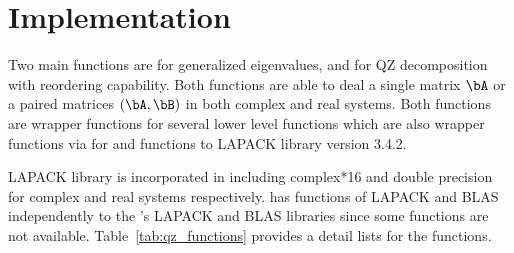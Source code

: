 

\section[Implementation]{Implementation}
\label{sec:implementation}

Two main functions are 
for generalized eigenvalues, and  for QZ decomposition with
reordering capability. Both functions are able to deal a single matrix $\bA$
or a paired matrices $(\bA,\bB)$ in both complex and real systems.
Both functions are wrapper functions for several lower level
 functions  which are also wrapper functions
via 
for  and  functions to LAPACK library 
version 3.4.2.

LAPACK library is incorporated in  including
complex*16 and double precision for complex and real systems respectively.
 has functions of
LAPACK and BLAS~\citep{BLAS}
independently to the 's LAPACK and BLAS libraries
since some functions are not available.
Table~\ref{tab:qz_functions} provides a detail lists for the 
functions.


